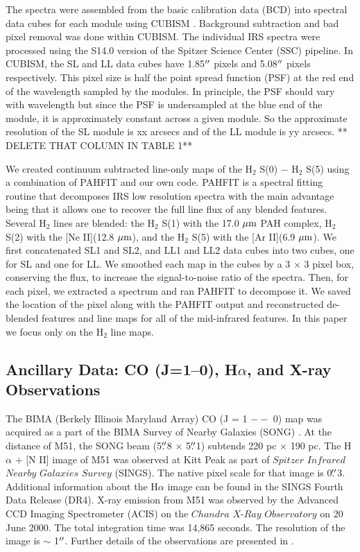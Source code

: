 \documentclass[manuscript]{aastex}
\begin{document}
The spectra were assembled from the basic calibration data (BCD) into
spectral data cubes for each module using CUBISM \citep{smi04}.
Background subtraction and bad pixel removal was done within CUBISM.
The individual IRS spectra were processed using the S14.0 version of
the Spitzer Science Center (SSC) pipeline.  In CUBISM, the SL and LL
data cubes have 1.85$\mbox{$^{\prime\prime}$}$ pixels and 5.08$\mbox{$^{\prime\prime}$}$ pixels
respectively.  This pixel size is half the point spread function (PSF)
at the red end of the wavelength sampled by the modules.  In
principle, the PSF should vary with wavelength but since the PSF is
undersampled at the blue end of the module, it is approximately
constant across a given module.  So the approximate resolution of the
SL module is xx arcsecs and of the LL module is yy arcsecs. ** DELETE
THAT COLUMN IN TABLE 1**



We created continuum subtracted line-only maps of the $\mathrm{H_2}$
S(0) $-$ $\mathrm{H_2}$ S(5) using a combination of PAHFIT
\citep{smi07} and our own code.  PAHFIT is a spectral fitting routine
that decomposes IRS low resolution spectra with the main advantage
being that it allows one to recover the full line flux of any blended
features.  Several $\mathrm{H_2}$ lines are blended: the
$\mathrm{H_2}$ S(1) with the 17.0 $\mbox{$\mu$m}$ PAH complex,
$\mathrm{H_2}$ S(2) with the [Ne II](12.8 $\mbox{$\mu$m}$), and the
$\mathrm{H_2}$ S(5) with the [Ar II](6.9 $\mbox{$\mu$m}$).  We first
concatenated SL1 and SL2, and LL1 and LL2 data cubes into two cubes,
one for SL and one for LL.  We smoothed each map in the cubes by a 3
$\times$ 3 pixel box, conserving the flux, to increase the
signal-to-noise ratio of the spectra.  Then, for each pixel, we
extracted a spectrum and ran PAHFIT to decompose it.  We saved the
location of the pixel along with the PAHFIT output and reconstructed
de-blended features and line maps for all of the mid-infrared
features.  In this paper we focus only on the $\mathrm{H_2}$ line maps.

\subsection{Ancillary Data: CO (J=1--0), H$\alpha$, and X-ray Observations}

The BIMA (Berkely Illinois Maryland Array) CO (J = 1 $--$ 0) map was
acquired as a part of the BIMA Survey of Nearby Galaxies (SONG)
\citep{reg01, hel03}.  At the distance of M51, the SONG beam
(5$\mbox{$.\!\!^{\prime\prime}$}$8 $\times$ 5$\mbox{$.\!\!^{\prime\prime}$}$1) subtends 220 pc $\times$ 190 pc.  The
H$\alpha$ + [N II] image of M51 was observed at Kitt Peak as part of
$Spitzer$ $Infrared$ $Nearby$ $Galaxies$ $Survey$ (SINGS).  The native
pixel scale for that image is 0$\mbox{$.\!\!^{\prime\prime}$}$3. Additional information about
the H$\alpha$ image can be found in the SINGS Fourth Data Release
(DR4).  X-ray emission from M51 was observed by the Advanced CCD
Imaging Spectrometer (ACIS) on the $Chandra$ $X$-$Ray$ $Observatory$
on 20 June 2000.  The total integration time was 14,865 seconds.  The
resolution of the image is $\sim$ 1$\mbox{$^{\prime\prime}$}$.  Further details of the
observations are presented in \citep{wil01}.
\end{document}
